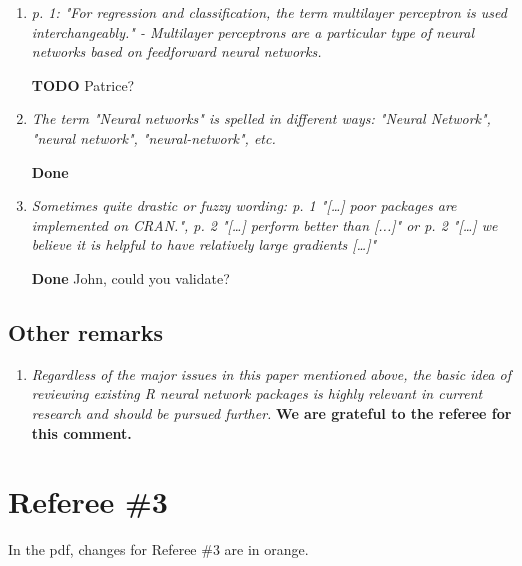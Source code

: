 \documentclass[12pt]{article}
\newcommand{\orange}[1]{{\color{orange}#1}}
\newcommand{\red}[1]{{\color{red}#1}}
\begin{document}
\begin{enumerate}[resume]
\item \textit{p. 1: "For regression and classification, the term multilayer perceptron is used interchangeably." - Multilayer perceptrons are a particular type of neural networks based on feedforward neural networks.}

\textbf{TODO}
\red{Patrice?}

\item \textit{The term "Neural networks" is spelled in different ways: "Neural Network", "neural network", "neural-network", etc.}

\textbf{Done}

 
\item \textit{Sometimes quite drastic or fuzzy wording: p. 1 "[…] poor packages are implemented on CRAN.", p. 2 "[…] perform better than [...]" or p. 2 "[…] we believe it is helpful to have relatively large gradients […]"}

\textbf{Done}
\red{John, could you validate?}

\end{enumerate}

\subsection*{Other remarks}

\begin{enumerate}[resume]
\item \textit{Regardless of the major issues in this paper mentioned above, the basic idea of reviewing existing R neural network packages is highly relevant in current research and should be pursued further.
}
\textbf{We are grateful to the referee for this comment.}
\end{enumerate}



\section{Referee \#3}\label{referee3}

In the pdf, changes for Referee  \#3 are in \orange{orange}.  
\end{document}
